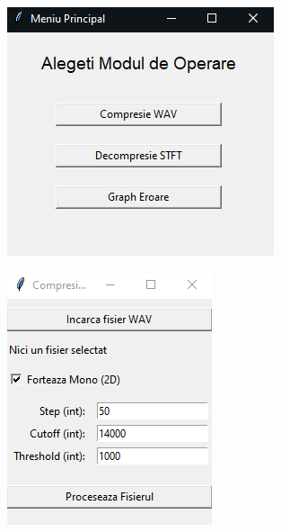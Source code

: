 \documentclass[12pt]{article}
\begin{document}
\begin{figure}[H]
	\centering
	\begin{subfigure}[b]{0.4\textwidth}
		\includegraphics[width=\linewidth]{ui1.png}
	\end{subfigure}
	\hfill
	\begin{subfigure}[b]{0.4\textwidth}
		\includegraphics[width=\linewidth]{ui2.png}

\end{subfigure}
\end{figure}
\end{document}
